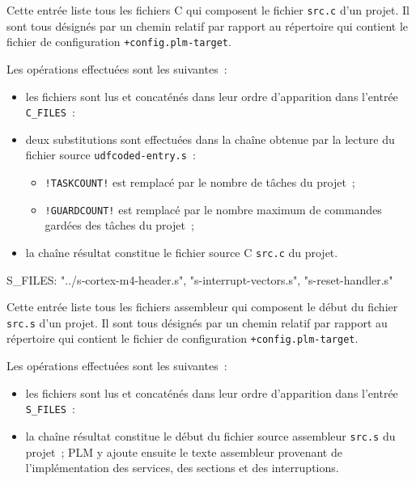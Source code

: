 Cette entrée liste tous les fichiers C qui composent le fichier \texttt{src.c} d'un projet. Il sont tous désignés par un chemin relatif par rapport au répertoire qui contient le fichier de configuration \texttt{+config.plm-target}.

Les opérations effectuées sont les suivantes~:
\begin{itemize}
  \item les fichiers sont lus et concaténés dans leur ordre d'apparition dans l'entrée \texttt{C\_FILES}~:
  \item deux substitutions sont effectuées dans la chaîne obtenue par la lecture du fichier source \texttt{udfcoded-entry.s}~:
  \begin{itemize}
    \item \texttt{!TASKCOUNT!} est remplacé par le nombre de tâches du projet~;
    \item \texttt{!GUARDCOUNT!} est remplacé par le nombre maximum de commandes gardées des tâches du projet~;
  \end{itemize}
  \item la chaîne résultat constitue le fichier source C \texttt{src.c} du projet.
\end{itemize}







\begin{PLM}
S_FILES:
  "../s-cortex-m4-header.s",
  "s-interrupt-vectors.s",
  "s-reset-handler.s"
\end{PLM}

Cette entrée liste tous les fichiers assembleur qui composent le début du fichier \texttt{src.s} d'un projet. Il sont tous désignés par un chemin relatif par rapport au répertoire qui contient le fichier de configuration \texttt{+config.plm-target}.

Les opérations effectuées sont les suivantes~:
\begin{itemize}
  \item les fichiers sont lus et concaténés dans leur ordre d'apparition dans l'entrée \texttt{S\_FILES}~:
  \item la chaîne résultat constitue le début du fichier source assembleur \texttt{src.s} du projet~; PLM y ajoute ensuite le texte assembleur provenant de l'implémentation des services, des sections et des interruptions.
\end{itemize}












